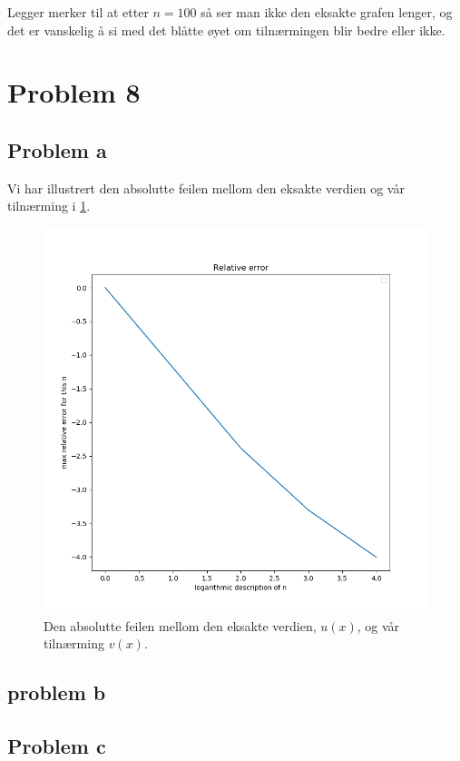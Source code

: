 \documentclass[english,notitlepage]{revtex4-1}  %
\begin{document}
Legger merker til at etter $n = 100$ så ser man ikke den eksakte grafen lenger, og det er vanskelig å si med det blåtte øyet om tilnærmingen blir bedre eller ikke.

\section*{Problem 8}

\subsection*{Problem a}
Vi har illustrert den absolutte feilen mellom den eksakte verdien og vår tilnærming i \ref{abserr}.

\begin{figure}
\centering
\includegraphics[scale=0.65]{abserr.png}
\caption{Den absolutte feilen mellom den eksakte verdien, $u(x)$, og vår tilnærming $v(x)$.}
\label{abserr}
\end{figure}
\subsection*{problem b}
\subsection*{Problem c}
\end{document}
